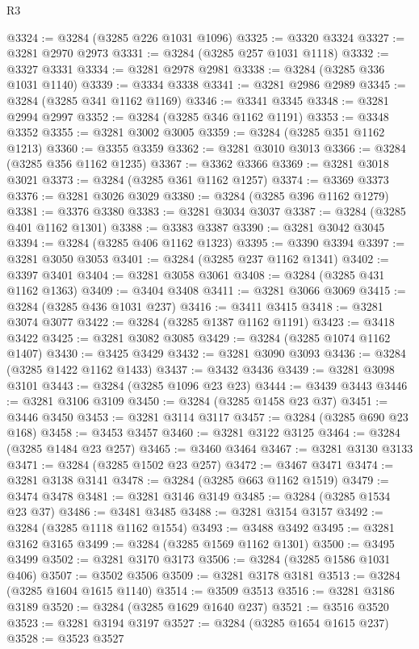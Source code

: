\begin{lexlean}{R3}
\begin{coremodule}
@3324 := @3284 (@3285 @226 @1031 @1096)
@3325 := @3320 @3324
@3327 := @3281 @2970 @2973
@3331 := @3284 (@3285 @257 @1031 @1118)
@3332 := @3327 @3331
@3334 := @3281 @2978 @2981
@3338 := @3284 (@3285 @336 @1031 @1140)
@3339 := @3334 @3338
@3341 := @3281 @2986 @2989
@3345 := @3284 (@3285 @341 @1162 @1169)
@3346 := @3341 @3345
@3348 := @3281 @2994 @2997
@3352 := @3284 (@3285 @346 @1162 @1191)
@3353 := @3348 @3352
@3355 := @3281 @3002 @3005
@3359 := @3284 (@3285 @351 @1162 @1213)
@3360 := @3355 @3359
@3362 := @3281 @3010 @3013
@3366 := @3284 (@3285 @356 @1162 @1235)
@3367 := @3362 @3366
@3369 := @3281 @3018 @3021
@3373 := @3284 (@3285 @361 @1162 @1257)
@3374 := @3369 @3373
@3376 := @3281 @3026 @3029
@3380 := @3284 (@3285 @396 @1162 @1279)
@3381 := @3376 @3380
@3383 := @3281 @3034 @3037
@3387 := @3284 (@3285 @401 @1162 @1301)
@3388 := @3383 @3387
@3390 := @3281 @3042 @3045
@3394 := @3284 (@3285 @406 @1162 @1323)
@3395 := @3390 @3394
@3397 := @3281 @3050 @3053
@3401 := @3284 (@3285 @237 @1162 @1341)
@3402 := @3397 @3401
@3404 := @3281 @3058 @3061
@3408 := @3284 (@3285 @431 @1162 @1363)
@3409 := @3404 @3408
@3411 := @3281 @3066 @3069
@3415 := @3284 (@3285 @436 @1031 @237)
@3416 := @3411 @3415
@3418 := @3281 @3074 @3077
@3422 := @3284 (@3285 @1387 @1162 @1191)
@3423 := @3418 @3422
@3425 := @3281 @3082 @3085
@3429 := @3284 (@3285 @1074 @1162 @1407)
@3430 := @3425 @3429
@3432 := @3281 @3090 @3093
@3436 := @3284 (@3285 @1422 @1162 @1433)
@3437 := @3432 @3436
@3439 := @3281 @3098 @3101
@3443 := @3284 (@3285 @1096 @23 @23)
@3444 := @3439 @3443
@3446 := @3281 @3106 @3109
@3450 := @3284 (@3285 @1458 @23 @37)
@3451 := @3446 @3450
@3453 := @3281 @3114 @3117
@3457 := @3284 (@3285 @690 @23 @168)
@3458 := @3453 @3457
@3460 := @3281 @3122 @3125
@3464 := @3284 (@3285 @1484 @23 @257)
@3465 := @3460 @3464
@3467 := @3281 @3130 @3133
@3471 := @3284 (@3285 @1502 @23 @257)
@3472 := @3467 @3471
@3474 := @3281 @3138 @3141
@3478 := @3284 (@3285 @663 @1162 @1519)
@3479 := @3474 @3478
@3481 := @3281 @3146 @3149
@3485 := @3284 (@3285 @1534 @23 @37)
@3486 := @3481 @3485
@3488 := @3281 @3154 @3157
@3492 := @3284 (@3285 @1118 @1162 @1554)
@3493 := @3488 @3492
@3495 := @3281 @3162 @3165
@3499 := @3284 (@3285 @1569 @1162 @1301)
@3500 := @3495 @3499
@3502 := @3281 @3170 @3173
@3506 := @3284 (@3285 @1586 @1031 @406)
@3507 := @3502 @3506
@3509 := @3281 @3178 @3181
@3513 := @3284 (@3285 @1604 @1615 @1140)
@3514 := @3509 @3513
@3516 := @3281 @3186 @3189
@3520 := @3284 (@3285 @1629 @1640 @237)
@3521 := @3516 @3520
@3523 := @3281 @3194 @3197
@3527 := @3284 (@3285 @1654 @1615 @237)
@3528 := @3523 @3527

\end{coremodule}
\end{lexlean}

